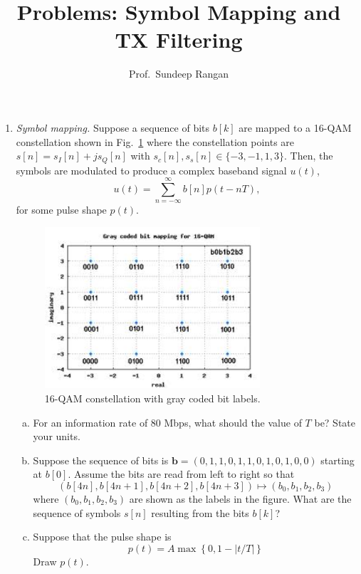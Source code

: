 \documentclass[11pt]{article}
\begin{document}
\title{Problems:  Symbol Mapping and TX Filtering}
\author{Prof.\ Sundeep Rangan}
\date{}

\maketitle

\begin{enumerate}

\item \emph{Symbol mapping.}  Suppose a sequence of bits $b[k]$ are mapped to a
16-QAM constellation shown in Fig.~\ref{fig:QAM16} where the constellation
points are $s[n] = s_I[n] + js_Q[n]$ with $s_c[n], s_s[n] \in \{ -3,-1,1,3\}$.
Then, the symbols are modulated to produce a complex baseband signal $u(t)$,
\[
    u(t) = \sum_{n=-\infty}^\infty b[n]p(t-nT),
\]
for some pulse shape $p(t)$.

\begin{figure}
\includegraphics[width=8cm]{QAM16.jpg}
\caption{16-QAM constellation with gray coded bit labels.   } \label{fig:QAM16}
\end{figure}

\begin{enumerate}[(a)]
\item For an information rate of 80 Mbps, what should the value of $T$ be?  State your units.

\item Suppose the sequence of bits is $\mathbf{b}
= (0,1,1,0, 1,1,0,1, 0,1,0,0)$ starting at $b[0]$.
Assume the bits are read from left to right so that
\[
    (b[4n],b[4n+1],b[4n+2],b[4n+3]) \mapsto (b_0,b_1,b_2,b_3)
\]
where $(b_0,b_1,b_2,b_3)$ are shown as the labels in the figure.
What are the sequence of symbols $s[n]$ resulting from the bits $b[k]$?

\item Suppose that the pulse shape is
\[
    p(t) = A\max\left\{0, 1-|t/T|\right\}
\]
Draw $p(t)$.


\end{enumerate}
\end{enumerate}
\end{document}
